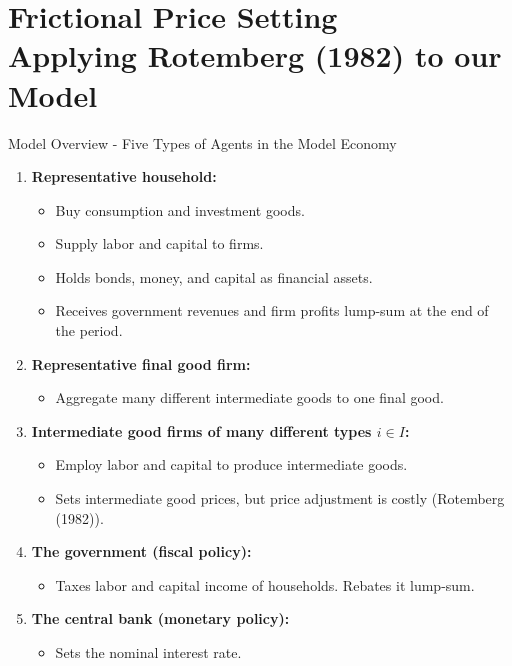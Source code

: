 \documentclass[10pt,c,aspectratio=1610,handout]{beamer}
\begin{document}
\section{Frictional Price Setting\\{\small Applying Rotemberg (1982) to our Model}}%
\begin{frame}{Model Overview - Five Types of Agents in the Model Economy}%
  \vspace*{0.1in}%
  \begin{enumerate}%
    \item \textbf{Representative household:}%
    \begin{itemize}%
      \item[$\rightarrow$] Buy consumption and investment goods.%
      \item[$\rightarrow$] Supply labor and capital to firms.%
      \item[$\rightarrow$] Holds bonds, money, and capital as financial assets.%
      \item[$\rightarrow$] Receives government revenues and firm profits lump-sum at the end of the period.%
    \end{itemize}%
    \vspace*{0.1in}%
    \pause%
    \item \textbf{Representative final good firm:}%
    \begin{itemize}%
      \item[$\rightarrow$] Aggregate many different intermediate goods to one final good.%
    \end{itemize}%
    \vspace*{0.1in}%
    \pause%
    \item \textbf{Intermediate good firms of many different types $i \in I$:}%
    \begin{itemize}%
      \item[$\rightarrow$] Employ labor and capital to produce intermediate goods.%
      \item[$\rightarrow$] Sets intermediate good prices, but price adjustment is costly (Rotemberg (1982)).%
    \end{itemize}%
    \vspace*{0.1in}%
    \pause%
    \item \textbf{The government (fiscal policy):}%
    \begin{itemize}%
      \item[$\rightarrow$] Taxes labor and capital income of households. Rebates it lump-sum.%
    \end{itemize}%
    \vspace*{0.1in}%
    \pause%
    \item \textbf{The central bank (monetary policy):}%
    \begin{itemize}%
      \item[$\rightarrow$] Sets the nominal interest rate.%
    \end{itemize}%
  \end{enumerate}%
\end{frame}%
\end{document}
